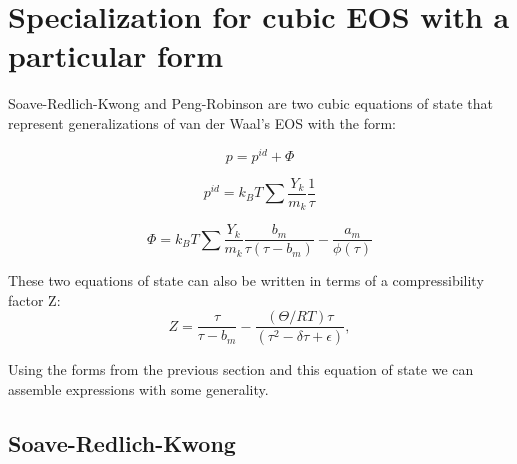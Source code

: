 \documentclass[11pt]{article}
\newcommand{\MarginPar}[1]{\marginpar{%
\vskip-\baselineskip %
\raggedright\tiny\sffamily
\hrule\smallskip{\color{red}#1}\par\smallskip\hrule}}
\begin{document}
\section{Specialization for cubic EOS with a particular form}
\label{sec:eos}


Soave-Redlich-Kwong and Peng-Robinson are two cubic equations of state that represent generalizations of
van der Waal's EOS with the form:

\[
p = p^{id} + \Phi
\]

\[
p^{id} = k_B T \sum \frac{Y_k}{m_k} \frac{1}{\tau}
\]

\[
\Phi
= k_B T \sum \frac{Y_k}{m_k} \frac{b_m}{\tau(\tau -b_m)} - \frac{a_m}{\phi(\tau)}
\]

These two equations of state can also be written in terms of a compressibility factor Z:
\begin{equation}
Z = \frac{\tau}{\tau-b_{m}} - \frac{\left(\Theta/RT\right) \tau}{\left(\tau^{2} - \delta \tau + \epsilon \right)},
\label{eq:PReosCompressibility}
\end{equation}


Using the forms from the previous section and this equation of state we can assemble expressions with some generality. 
%
\subsection{Soave-Redlich-Kwong}
\end{document}
